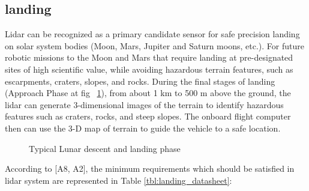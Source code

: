 \subsection{landing}
Lidar can be recognized as a primary candidate sensor for safe precision landing on solar system bodies (Moon, Mars, Jupiter and Saturn moons, etc.).
For future robotic missions to the Moon and Mars that require
landing at pre-designated sites of high scientific value, while avoiding hazardous terrain features, such as escarpments, craters, slopes, and rocks.
During the final stages of landing (Approach Phase at fig ~\ref{fig:landing}), from about 1 km to 500 m above the ground, the 
lidar can generate 3-dimensional images of the terrain to identify hazardous features such as craters, rocks, and steep slopes. The onboard flight computer then can use the 3-D map of terrain to guide the vehicle to a safe location.

\begin{figure}[h]
  \caption{Typical Lunar descent and landing phase}%
\label{fig:landing} %
\end{figure}

According to [A8, A2], the minimum requirements which should be satisfied in lidar system are represented in Table \ref{tbl:landing_datasheet}:



\begin{figure}[h]
\begin{floatrow}
\end{floatrow}
\end{figure}


